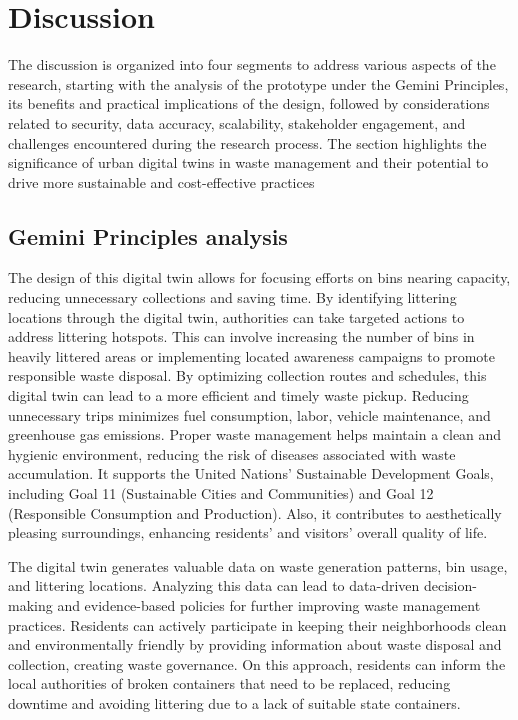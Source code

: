 \documentclass[authoryear,preprint,review,12pt]{elsarticle}
\begin{document}
    \section{Discussion} \label{sec:Discussion}

    The discussion is organized into four segments to address various aspects of the research, starting with the analysis of the prototype under the Gemini Principles, its benefits and practical implications of the design, followed by considerations related to security, data accuracy, scalability, stakeholder engagement, and challenges encountered during the research process. The section highlights the significance of urban digital twins in waste management and their potential to drive more sustainable and cost-effective practices

    \subsection{Gemini Principles analysis} \label{subsec:Gemini}
    The design of this digital twin allows for focusing efforts on bins nearing capacity, reducing unnecessary collections and saving time. By identifying littering locations through the digital twin, authorities can take targeted actions to address littering hotspots. This can involve increasing the number of bins in heavily littered areas or implementing located awareness campaigns to promote responsible waste disposal. By optimizing collection routes and schedules, this digital twin can lead to a more efficient and timely waste pickup. Reducing unnecessary trips minimizes fuel consumption, labor, vehicle maintenance, and greenhouse gas emissions. Proper waste management helps maintain a clean and hygienic environment, reducing the risk of diseases associated with waste accumulation. It supports the United Nations' Sustainable Development Goals, including Goal 11 (Sustainable Cities and Communities) and Goal 12 (Responsible Consumption and Production). Also, it contributes to aesthetically pleasing surroundings, enhancing residents' and visitors' overall quality of life.

    The digital twin generates valuable data on waste generation patterns, bin usage, and littering locations. Analyzing this data can lead to data-driven decision-making and evidence-based policies for further improving waste management practices. Residents can actively participate in keeping their neighborhoods clean and environmentally friendly by providing information about waste disposal and collection, creating waste governance. On this approach, residents can inform the local authorities of broken containers that need to be replaced, reducing downtime and avoiding littering due to a lack of suitable state containers.
\end{document}
